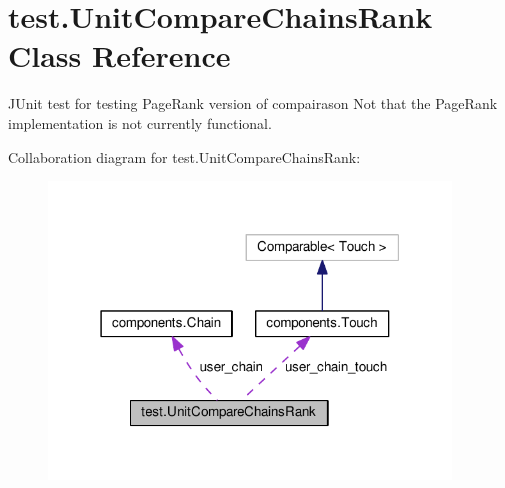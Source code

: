 \hypertarget{classtest_1_1_unit_compare_chains_rank}{}\section{test.\+Unit\+Compare\+Chains\+Rank Class Reference}
\label{classtest_1_1_unit_compare_chains_rank}


J\+Unit test for testing Page\+Rank version of compairason Not that the Page\+Rank implementation is not currently functional.  




Collaboration diagram for test.\+Unit\+Compare\+Chains\+Rank\+:\nopagebreak
\begin{figure}[H]
\begin{center}
\leavevmode
\includegraphics[width=303pt]{classtest_1_1_unit_compare_chains_rank__coll__graph}
\end{center}
\end{figure}
